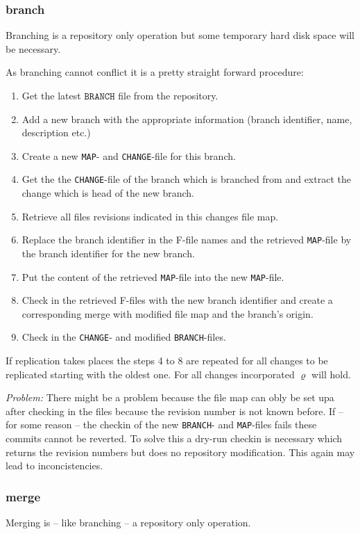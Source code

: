 \documentclass[fleqn, 10pt, a4paper]{article}
\begin{document}
\subsubsection{branch}
Branching is a repository only operation but some temporary
hard disk space will be necessary.

As branching cannot conflict it is a pretty straight forward
procedure:
\begin{enumerate}
\item Get the latest $\mathtt{BRANCH}$ file from the repository.
\item Add a new branch with the appropriate information (branch
identifier, name, description etc.)
\item Create a new \texttt{MAP}- and \texttt{CHANGE}-file for
this branch.
\item Get the the \texttt{CHANGE}-file of the branch which
is branched from and extract the change which is head of the new
branch.
\item Retrieve all files revisions indicated in this changes
file map.
\item Replace the branch identifier in the F-file names and the
retrieved \texttt{MAP}-file by the branch identifier for the
new branch.
\item Put the content of the retrieved \texttt{MAP}-file into
the new \texttt{MAP}-file.
\item Check in the retrieved F-files with the new branch identifier
and create a corresponding merge with modified file map
and the branch's origin.
\item Check in the \texttt{CHANGE}- and modified \texttt{BRANCH}-files.
\end{enumerate}

If replication takes places the steps 4 to 8 are repeated for all
changes to be replicated starting with the oldest one. For all
changes incorporated $\varrho$ will hold.

\emph{Problem:} There might be a problem because the file map can
obly be set upa after checking in the files because the revision
number is not known before. If -- for some reason -- the checkin
of the new \texttt{BRANCH}- and \texttt{MAP}-files fails these
commits cannot be reverted. To solve this a dry-run checkin is necessary
which returns the revision numbers but does no repository modification.
This again may lead to inconcistencies.

\subsubsection{merge}
Merging is -- like branching -- a repository only
operation.
\end{document}
